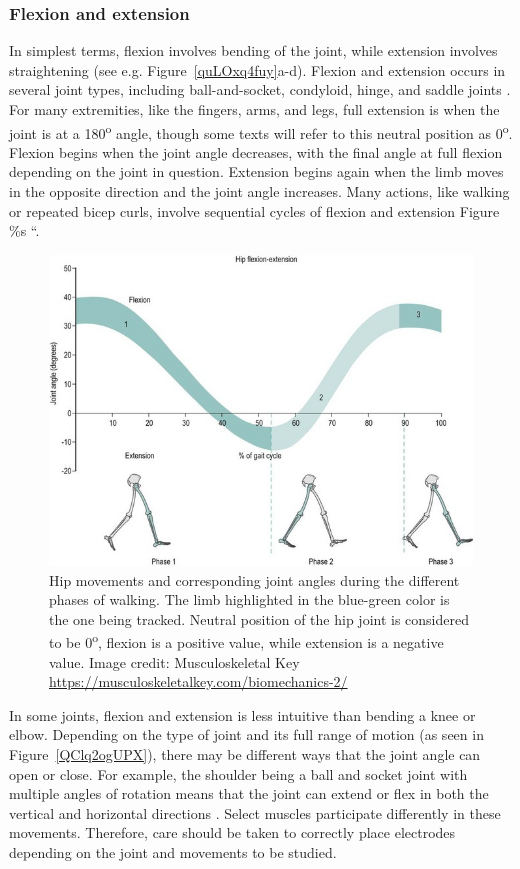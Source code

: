 \documentclass{article}
\begin{document}
\subsubsection{Flexion and extension}

In simplest terms, flexion involves bending of the joint, while extension involves straightening (see e.g. Figure~\ref{quLOxq4fuy}a-d). Flexion and extension occurs in several joint types, including ball-and-socket, condyloid, hinge, and saddle joints \citep{openStax_movements}. For many extremities, like the fingers, arms, and legs, full extension is when the joint is at a 180\textsuperscript{o} angle, though some texts will refer to this neutral position as 0\textsuperscript{o}. Flexion begins when the joint angle decreases, with the final angle at full flexion depending on the joint in question. Extension begins again when the limb moves in the opposite direction and the joint angle increases. Many actions, like walking or repeated bicep curls, involve sequential cycles of flexion and extension \citep{}Figure \%s ``.

\begin{figure}[!htbp]
\centering
\includegraphics[width=0.8\linewidth]{files/EPpXta8zJdzN048lz8AR-8071555d61a8c30630693b2900e84506.png}
\caption[]{Hip movements and corresponding joint angles during the different phases of walking. The limb highlighted in the blue-green color is the one being tracked. Neutral position of the hip joint is considered to be 0\textsuperscript{o}, flexion is a positive value, while extension is a negative value. Image credit: Musculoskeletal Key \href{https://musculoskeletalkey.com/biomechanics-2/}{https://musculoskeletalkey.com/biomechanics-2/}}
\label{iKYfFOGvoB}
\end{figure}

In some joints, flexion and extension is less intuitive than bending a knee or elbow. Depending on the type of joint and its full range of motion (as seen in Figure~\ref{QClq2ogUPX}), there may be different ways that the joint angle can open or close. For example, the shoulder being a ball and socket joint with multiple angles of rotation means that the joint can extend or flex in both the vertical and horizontal directions \citep{cardoso2023activity}. Select muscles participate differently in these movements. Therefore, care should be taken to correctly place electrodes depending on the joint and movements to be studied.
\end{document}
